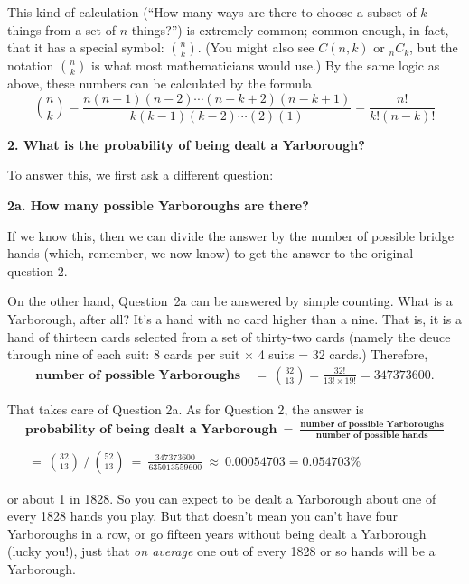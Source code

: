\documentclass{amsart}
\numberwithin{equation}{section}
\newcommand{\x}{\times}
\begin{document}
This kind of calculation (``How many ways are there to choose a subset of $k$ things from a set of $n$ things?'') is extremely
common; common enough, in fact, that it has a special symbol: $\binom{n}{k}$.  (You might also see $C(n,k)$ or ${}_nC_k$,
but the notation $\binom{n}{k}$ is what most mathematicians would use.)  By the same logic as above, these numbers can be
calculated by the formula
$$\binom{n}{k} = \frac{n(n-1)(n-2)\cdots(n-k+2)(n-k+1)}{k(k-1)(k-2)\cdots(2)(1)} = \frac{n!}{k!(n-k)!}$$

\pagebreak

\textbf{2. What is the probability of being dealt a Yarborough?}

To answer this, we first ask a different question:

\textbf{2a. How many possible Yarboroughs are there?}

If we know this, then we can divide the answer by the number of possible bridge hands (which, remember,
we now know) to get the answer to the original question 2.

On the other hand, Question~2a can be answered by simple counting.  What is a Yarborough, after all?  It's a hand
with no card higher than a nine.  That is, it is a hand of thirteen cards selected from a set of thirty-two cards
(namely the deuce through nine of each suit: 8 cards per suit $\x$ 4 suits = 32 cards.)  Therefore,
\boldmath
\begin{align*}
\textbf{number of possible Yarboroughs} &~=~ \binom{32}{13} = \frac{32!}{13!\x19!} = 347373600.
\end{align*}
\unboldmath

That takes care of Question 2a.  As for Question 2, the answer is
\boldmath
\begin{multline*}
\textbf{probability of being dealt a Yarborough} ~=~ 
\frac{\textbf{number of possible Yarboroughs}}{\textbf{number of possible hands}}\\\\
~=~ \binom{32}{13} ~/~ \binom{52}{13} ~=~ \frac{347373600}{635013559600} ~\approx~ 0.00054703 = 0.054703\%
\end{multline*}
\unboldmath

or about 1 in 1828.  So you can expect to be dealt a Yarborough about one of every 1828 hands you play.
But that doesn't mean you can't have four Yarboroughs in a row, or go fifteen years without being dealt a Yarborough (lucky you!),
just that \emph{on average} one out of every 1828 or so hands will be a Yarborough.
\end{document}
